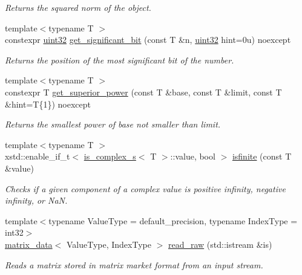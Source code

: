 \begin{DoxyCompactItemize}
\begin{DoxyCompactList}\small\item\em Returns the squared norm of the object. \end{DoxyCompactList}\item 
{\footnotesize template$<$typename T $>$ }\\constexpr \hyperlink{namespacegko_a318c831e3fe269ba04c6ed8bf5a71073}{uint32} \hyperlink{namespacegko_a4eea40e4123a3fdb60fcd92f902c6d6d}{get\+\_\+significant\+\_\+bit} (const T \&n, \hyperlink{namespacegko_a318c831e3fe269ba04c6ed8bf5a71073}{uint32} hint=0u) noexcept
\begin{DoxyCompactList}\small\item\em Returns the position of the most significant bit of the number. \end{DoxyCompactList}\item 
{\footnotesize template$<$typename T $>$ }\\constexpr T \hyperlink{namespacegko_ad39645fe8148a8a812a9528865a77600}{get\+\_\+superior\+\_\+power} (const T \&base, const T \&limit, const T \&hint=T\{1\}) noexcept
\begin{DoxyCompactList}\small\item\em Returns the smallest power of {\ttfamily base} not smaller than {\ttfamily limit}. \end{DoxyCompactList}\item 
{\footnotesize template$<$typename T $>$ }\\xstd\+::enable\+\_\+if\+\_\+t$<$ \hyperlink{namespacegko_aeede19206954d5c8ebd04c95cf63bb88}{is\+\_\+complex\+\_\+s}$<$ T $>$\+::value, bool $>$ \hyperlink{namespacegko_afb0f20b5d373f9439702e723d48548fa}{isfinite} (const T \&value)
\begin{DoxyCompactList}\small\item\em Checks if a given component of a complex value is positive infinity, negative infinity, or NaN. \end{DoxyCompactList}\item 
{\footnotesize template$<$typename Value\+Type  = default\+\_\+precision, typename Index\+Type  = int32$>$ }\\\hyperlink{structgko_1_1matrix__data}{matrix\+\_\+data}$<$ Value\+Type, Index\+Type $>$ \hyperlink{namespacegko_a0b476e0e3df616b08efe85000bff8da0}{read\+\_\+raw} (std\+::istream \&is)
\begin{DoxyCompactList}\small\item\em Reads a matrix stored in matrix market format from an input stream. \end{DoxyCompactList}\item 

\end{DoxyCompactItemize}
